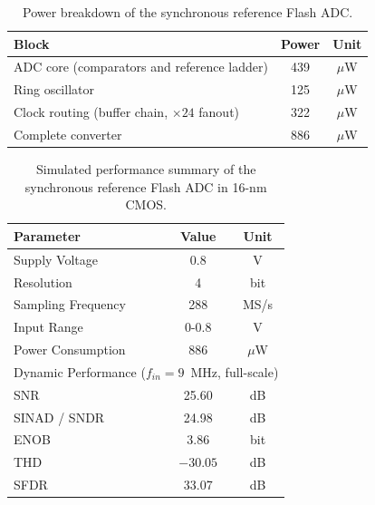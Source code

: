 \begin{table}[htbp]
    \centering
    \caption{Power breakdown of the synchronous reference Flash ADC.}
    \label{tab:sync_power_breakdown}
    \renewcommand{\arraystretch}{1.4}
    \begin{tabular}{lcc}
        \toprule
        \textbf{Block}                                 & \textbf{Power} & \textbf{Unit} \\
        \midrule
        ADC core (comparators and reference ladder)    & 439            & $\mu$W        \\
        Ring oscillator                                & 125            & $\mu$W        \\
        Clock routing (buffer chain, $\times 24$ fanout) & 322          & $\mu$W        \\
        \midrule
        Complete converter                             & 886            & $\mu$W        \\
        \bottomrule
    \end{tabular}
\end{table}

\begin{table}[htbp]
    \centering
    \caption{Simulated performance summary of the synchronous reference Flash ADC in 16-nm CMOS.}
    \label{tab:sync_results}
    \renewcommand{\arraystretch}{1.4}
    \begin{tabular}{lcc}
        \toprule
        \textbf{Parameter}                       & \textbf{Value} & \textbf{Unit}         \\
        \midrule
        Supply Voltage                           & 0.8            & V                     \\
        Resolution                               & 4              & bit                   \\
        Sampling Frequency                       & 288            & MS/s                  \\
        Input Range                              & 0-0.8         & V                     \\
        Power Consumption                        & 886            & $\mu$W                \\
        \midrule
        \multicolumn{3}{l}{Dynamic Performance ($f_{in} = 9$~MHz, full-scale)}    \\
        \midrule
        SNR                                      & 25.60          & dB                    \\
        SINAD / SNDR                             & 24.98          & dB                    \\
        ENOB                                     & 3.86           & bit                   \\
        THD                                      & $-30.05$       & dB                    \\
        SFDR                                     & 33.07          & dB                    \\
         \bottomrule
    \end{tabular}
\end{table}




